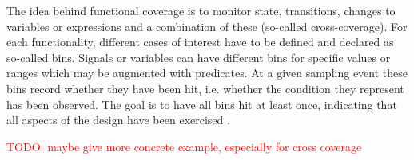 \documentclass[11pt]{report}
\newcommand{\todo}[1]{\textcolor{red}{TODO: #1}}
\begin{document}
The idea behind functional coverage is to monitor state, transitions, changes to variables or expressions and a
combination of these (so-called cross-coverage). For each functionality, different cases of interest have to be
defined and declared as so-called bins. Signals or variables can have different bins for specific values or ranges
which may be augmented with predicates. At a given sampling event these bins record whether they have been hit, i.e.
whether the condition they represent has been observed. The goal is to have all bins hit at least once, indicating
that all aspects of the design have been exercised \cite[Sec. 7.6]{flake2020a}.

\todo{maybe give more concrete example, especially for cross coverage}

\begin{comment}

\cite[Ch. 15]{mehta2021introduction}
- how to measure how well the testbench is performing?
- especially in the case of CRV this becomes essential, since it is not clear what functionality has been tested under which conditions

\cite[Ch. 2]{bergeron2012writing}
- code coverage provides insight into how much of the source code or structure of the DUV has been exercised by a test suite
- via adding instrumentation to the design, the activity of certain aspects of the design is monitored

\cite[Ch. 15]{mehta2021introduction}
- at the simplest level, line coverage checks whether a line of code has been executed
- more useful is statement coverage which looks at each statement independent of its position in the code
- branch coverage concerns itself with control flow, it measures how many of the different paths through a piece of code have been taken
- finally, FSM coverage recognizes FSM patterns in the source code
- it can report which states have been visited, which transitions have occurred
- does not know about valid transitions though, illegal ones have to be filtered out manually

- code coverage can indicate that the verification is NOT down, never whether it is done \cite[Ch. 2]{bergeron2012writing}

- a more general concept of coverage is needed, functional coverage \cite[Sec. 7]{flake2020a}
- it has to be based on the design specification, can't be derived and thus manual work \cite[Ch. 15]{mehta2021introduction}

\cite[Sec. 7]{flake2020a}
- essentially about monitoring state, state transitions, changes to variables and expressions and combinations of these (cross)
- one bin for each state, transition, cross... which corresponds to a functional aspect of the DUT
- all bins should have hits

\end{comment}
\end{document}
